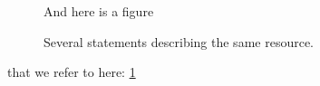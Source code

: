 \documentclass[a4paper,12pt]{kth-mag}
\begin{document}
\begin{figure}[ht]
\begin{center}
And here is a figure
\caption{\small{Several statements describing the same resource.}}\label{RDF_4}
\end{center}
\end{figure}

that we refer to here: \ref{RDF_4}

\newpage
\renewcommand{\refname}{\section{References}}



\end{document}
